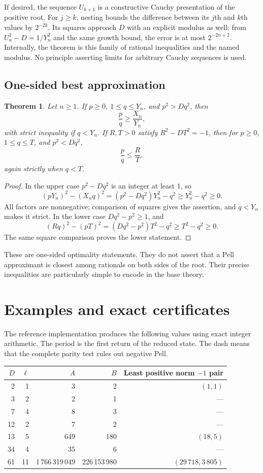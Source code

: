 \documentclass[11pt,letterpaper]{article}
\newtheorem{theorem}{Theorem}[section]
\theoremstyle{definition}
\begin{document}
If desired, the sequence $U_{k+1}$ is a constructive Cauchy presentation of
the positive root. For $j\ge k$, nesting bounds the difference between
its $j$th and $k$th values by $2^{-2k}$. Its squares approach $D$ with
an explicit modulus as well: from $U_n^2-D=1/Y_n^2$ and the same growth
bound, the error is at most $2^{-2n+2}$. Internally, the theorem is this
family of rational inequalities and the named modulus. No principle
asserting limits for arbitrary Cauchy sequences is used.

\subsection{One-sided best approximation}

\begin{theorem}\label{thm:onesided}
Let $n\ge1$. If $p\ge0$, $1\le q\le Y_n$, and $p^2>Dq^2$, then
\[
 \frac pq\ge\frac{X_n}{Y_n},
\]
with strict inequality if $q<Y_n$. If $R,T>0$ satisfy
$R^2-DT^2=-1$, then for $p\ge0$, $1\le q\le T$, and $p^2<Dq^2$,
\[
 \frac pq\le\frac RT,
\]
again strictly when $q<T$.
\end{theorem}
\begin{proof}
In the upper case $p^2-Dq^2$ is an integer at least $1$, so
\[
 (pY_n)^2-(X_nq)^2
 =(p^2-Dq^2)Y_n^2-q^2\ge Y_n^2-q^2\ge0.
\]
All factors are nonnegative; comparison of squares gives the assertion,
and $q<Y_n$ makes it strict.
In the lower case $Dq^2-p^2\ge1$, and
\[
 (Rq)^2-(pT)^2=(Dq^2-p^2)T^2-q^2\ge T^2-q^2\ge0.
\]
The same square comparison proves the lower statement.
\end{proof}

These are one-sided optimality statements. They do not assert that a Pell
approximant is closest among rationals on both sides of the root. Their
precise inequalities are particularly simple to encode in the base theory.

\section{Examples and exact certificates}\label{sec:examples}

The reference implementation produces the following values using exact
integer arithmetic. The period is the first return of the reduced state.
The dash means that the complete parity test rules out negative Pell.

\begin{center}
\small
\begin{tabular}{rrrrr}
\toprule
$D$ & $\ell$ & $A$ & $B$ & Least positive norm $-1$ pair\\
\midrule
2 & 1 & 3 & 2 & $(1,1)$\\
3 & 2 & 2 & 1 & ---\\
7 & 4 & 8 & 3 & ---\\
12 & 2 & 7 & 2 & ---\\
13 & 5 & 649 & 180 & $(18,5)$\\
34 & 4 & 35 & 6 & ---\\
61 & 11 & 1\,766\,319\,049 & 226\,153\,980 & $(29\,718,3\,805)$\\
\bottomrule
\end{tabular}
\end{center}
\end{document}

